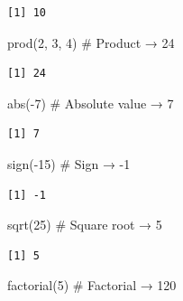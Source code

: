 \documentclass[
  letterpaper,
  DIV=11,
  numbers=noendperiod]{scrreprt}
\newenvironment{Shaded}{\begin{snugshade}}{\end{snugshade}}
\newcommand{\CommentTok}[1]{\textcolor[rgb]{0.37,0.37,0.37}{#1}}
\newcommand{\DecValTok}[1]{\textcolor[rgb]{0.68,0.00,0.00}{#1}}
\newcommand{\FunctionTok}[1]{\textcolor[rgb]{0.28,0.35,0.67}{#1}}
\newcommand{\NormalTok}[1]{\textcolor[rgb]{0.00,0.23,0.31}{#1}}
\newcommand{\SpecialCharTok}[1]{\textcolor[rgb]{0.37,0.37,0.37}{#1}}
\begin{document}
\begin{verbatim}
[1] 10
\end{verbatim}

\begin{Shaded}
\begin{Highlighting}[]
\FunctionTok{prod}\NormalTok{(}\DecValTok{2}\NormalTok{, }\DecValTok{3}\NormalTok{, }\DecValTok{4}\NormalTok{)          }\CommentTok{\# Product → 24}
\end{Highlighting}
\end{Shaded}

\begin{verbatim}
[1] 24
\end{verbatim}

\begin{Shaded}
\begin{Highlighting}[]
\FunctionTok{abs}\NormalTok{(}\SpecialCharTok{{-}}\DecValTok{7}\NormalTok{)                }\CommentTok{\# Absolute value → 7}
\end{Highlighting}
\end{Shaded}

\begin{verbatim}
[1] 7
\end{verbatim}

\begin{Shaded}
\begin{Highlighting}[]
\FunctionTok{sign}\NormalTok{(}\SpecialCharTok{{-}}\DecValTok{15}\NormalTok{)              }\CommentTok{\# Sign → {-}1}
\end{Highlighting}
\end{Shaded}

\begin{verbatim}
[1] -1
\end{verbatim}

\begin{Shaded}
\begin{Highlighting}[]
\FunctionTok{sqrt}\NormalTok{(}\DecValTok{25}\NormalTok{)               }\CommentTok{\# Square root → 5}
\end{Highlighting}
\end{Shaded}

\begin{verbatim}
[1] 5
\end{verbatim}

\begin{Shaded}
\begin{Highlighting}[]
\FunctionTok{factorial}\NormalTok{(}\DecValTok{5}\NormalTok{)           }\CommentTok{\# Factorial → 120}
\end{Highlighting}
\end{Shaded}
\end{document}

